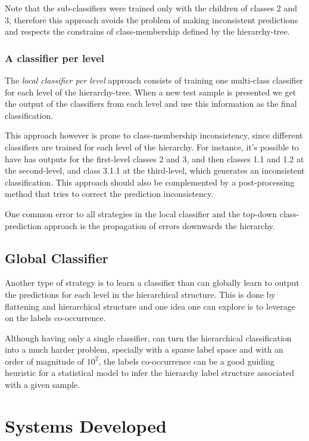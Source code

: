 \documentclass[11pt,a4paper]{article}
\begin{document}
Note that the sub-classifiers were trained only with the children of classes 2 and 3, therefore
this approach avoids the problem of making inconsistent predictions and respects the constrains
of class-membership defined by the hierarchy-tree.


\subsubsection{A classifier per level} %
The \textit{local classifier per level} approach consists of training one multi-class classifier
for each level of the hierarchy-tree. When a new test sample is presented we get the output of the
classifiers from each level and use this information as the final classification.

This approach however is prone to class-membership inconsistency, since different classifiers are
trained for each level of the hierarchy. For instance, it's possible to have has outputs for the
first-level classes 2 and 3, and then classes 1.1 and 1.2 at the second-level, and class 3.1.1
at the third-level, which generates an inconsistent classification. This approach should also
be complemented by a post-processing method that tries to correct the prediction inconsistency.

One common error to all strategies in the local classifier and the top-down class-prediction
approach is the propagation of errors downwards the hierarchy.



\subsection{Global Classifier}

Another type of strategy is to learn a classifier than can globally learn to
output the predictions for each level in the hierarchical structure. This is
done by flattening and hierarchical structure and one idea one can explore is to
leverage on the labels co-occurrence.

Although having only a single classifier, can turn the hierarchical classification
into a much harder problem, specially with a sparse label space and with an order
of magnitude of $10^2$, the labels co-occurrence can be a good guiding heuristic
for a statistical model to infer the hierarchy label structure associated with
a given sample.

\section{Systems Developed}\label{system}
\end{document}

